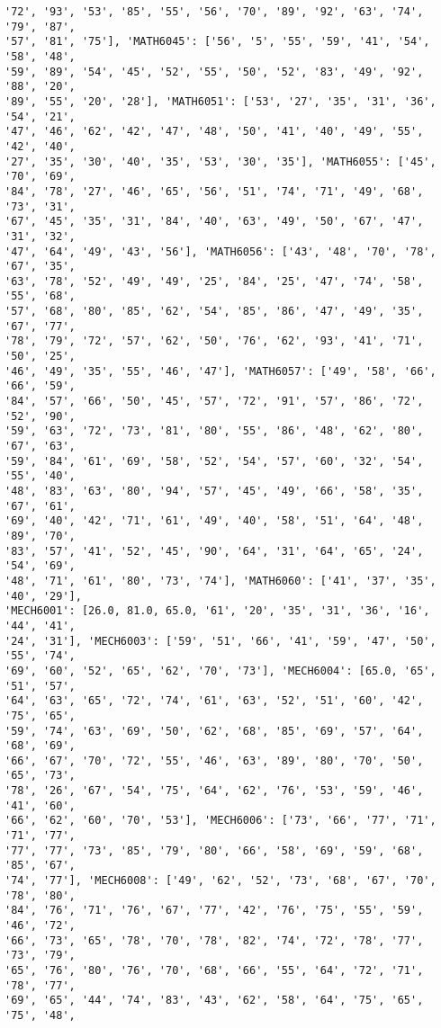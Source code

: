 \documentclass[11pt]{article}
\begin{document}
\begin{Verbatim}[commandchars=\\\{\}]
'72', '93', '53', '85', '55', '56', '70', '89', '92', '63', '74', '79', '87',
'57', '81', '75'], 'MATH6045': ['56', '5', '55', '59', '41', '54', '58', '48',
'59', '89', '54', '45', '52', '55', '50', '52', '83', '49', '92', '88', '20',
'89', '55', '20', '28'], 'MATH6051': ['53', '27', '35', '31', '36', '54', '21',
'47', '46', '62', '42', '47', '48', '50', '41', '40', '49', '55', '42', '40',
'27', '35', '30', '40', '35', '53', '30', '35'], 'MATH6055': ['45', '70', '69',
'84', '78', '27', '46', '65', '56', '51', '74', '71', '49', '68', '73', '31',
'67', '45', '35', '31', '84', '40', '63', '49', '50', '67', '47', '31', '32',
'47', '64', '49', '43', '56'], 'MATH6056': ['43', '48', '70', '78', '67', '35',
'63', '78', '52', '49', '49', '25', '84', '25', '47', '74', '58', '55', '68',
'57', '68', '80', '85', '62', '54', '85', '86', '47', '49', '35', '67', '77',
'78', '79', '72', '57', '62', '50', '76', '62', '93', '41', '71', '50', '25',
'46', '49', '35', '55', '46', '47'], 'MATH6057': ['49', '58', '66', '66', '59',
'84', '57', '66', '50', '45', '57', '72', '91', '57', '86', '72', '52', '90',
'59', '63', '72', '73', '81', '80', '55', '86', '48', '62', '80', '67', '63',
'59', '84', '61', '69', '58', '52', '54', '57', '60', '32', '54', '55', '40',
'48', '83', '63', '80', '94', '57', '45', '49', '66', '58', '35', '67', '61',
'69', '40', '42', '71', '61', '49', '40', '58', '51', '64', '48', '89', '70',
'83', '57', '41', '52', '45', '90', '64', '31', '64', '65', '24', '54', '69',
'48', '71', '61', '80', '73', '74'], 'MATH6060': ['41', '37', '35', '40', '29'],
'MECH6001': [26.0, 81.0, 65.0, '61', '20', '35', '31', '36', '16', '44', '41',
'24', '31'], 'MECH6003': ['59', '51', '66', '41', '59', '47', '50', '55', '74',
'69', '60', '52', '65', '62', '70', '73'], 'MECH6004': [65.0, '65', '51', '57',
'64', '63', '65', '72', '74', '61', '63', '52', '51', '60', '42', '75', '65',
'59', '74', '63', '69', '50', '62', '68', '85', '69', '57', '64', '68', '69',
'66', '67', '70', '72', '55', '46', '63', '89', '80', '70', '50', '65', '73',
'78', '26', '67', '54', '75', '64', '62', '76', '53', '59', '46', '41', '60',
'66', '62', '60', '70', '53'], 'MECH6006': ['73', '66', '77', '71', '71', '77',
'77', '77', '73', '85', '79', '80', '66', '58', '69', '59', '68', '85', '67',
'74', '77'], 'MECH6008': ['49', '62', '52', '73', '68', '67', '70', '78', '80',
'84', '76', '71', '76', '67', '77', '42', '76', '75', '55', '59', '46', '72',
'66', '73', '65', '78', '70', '78', '82', '74', '72', '78', '77', '73', '79',
'65', '76', '80', '76', '70', '68', '66', '55', '64', '72', '71', '78', '77',
'69', '65', '44', '74', '83', '43', '62', '58', '64', '75', '65', '75', '48',

\end{Verbatim}
\end{document}
